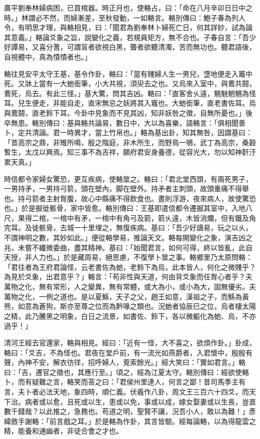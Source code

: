 \begin{pinyinscope}
廣平劉奉林婦病困，已買棺器。時正月也，使輅占，曰：「命在八月辛卯日日中之時。」林謂必不然，而婦漸差，至秋發動，一如輅言。輅別傳曰：鮑子春為列人令，有明思才理，與輅相見，曰：「聞君為劉奉林卜婦死亡日，何其詳妙，試為論其意義。」輅論爻象之旨，說變化之義，若規員矩方，無不合也。子春自言：「吾少好譚易，又喜分蓍，可謂盲者欲視白黑，聾者欲聽清濁，苦而無功也。聽君語後，自視體中，真為憒憒者也。」

輅往見安平太守王基，基令作卦，輅曰：「當有賤婦人生一男兒，墯地便走入竈中死。又牀上當有一大虵銜筆，小大共視，須臾去之也。又烏來入室中，與鷰共鬪，鷰死，烏去。有此三怪。」基大驚，問其吉凶。輅曰：「直客舍乆遠，魑魅魍魎為怪耳。兒生便走，非能自走，直宋無忌之妖將其入竈也。大虵銜筆，直老書佐耳。烏與鷰鬪，直老鈴下耳。今卦中見象而不見其凶，知非妖咎之徵，自無所憂也。」後卒無患。輅別傳曰：基與輅共論易，數日中，大以為喜樂，語輅言：「俱相聞善卜，定共清論。君一時異才，當上竹帛也。」輅為基出卦，知其無咎，因謂基曰：「昔高宗之鼎，非雉所鳴，殷之階庭，非木所生，而野鳥一鴝，武丁為高宗，桑穀暫生，太戊以興焉。知三事不為吉祥，願府君安身養德，從容光大，勿以知神姧汙累天真。」

時信都令家婦女驚恐，更互疾病，使輅筮之。輅曰：「君北堂西頭，有兩死男子，一男持矛，一男持弓箭，頭在壁內，脚在壁外。持矛者主刺頭，故頭重痛不得舉也。持弓箭者主射胷腹，故心中縣痛不得飲食也。晝則浮游，夜來病人，故使驚恐也。」於是掘徙骸骨，家中皆愈。輅別傳曰：王基即遣信都令遷掘其室中，入地八尺，果得二棺，一棺中有矛，一棺中有角弓及箭，箭乆遠，木皆消爛，但有鐵及角完耳。及徙骸骨，去城一十里埋之，無復疾病。基曰：「吾少好讀易，玩之以乆，不謂神明之數，其妙如此。」便從輅學易，推論天文。輅每開變化之象，演吉凶之兆，未嘗不纖微委曲，盡其精神。基曰：「始聞君言，如何可得，終以皆亂，此自天授，非人力也。」於是藏周易，絕思慮，不復學卜筮之事。輅鄉里乃太原問輅：「君往者為王府君論怪，云老書佐為虵，老鈴下為烏，此本皆人，何化之微賤乎？為見於爻象，出君意乎？」輅言：「苟非性與天道，何由背爻象而任胷心者乎？夫萬物之化，無有常形，人之變異，無有常體，或大為小，或小為大，固無優劣。夫萬物之化，一例之道也。是以夏鯀，天子之父，趙王如意，漢祖之子，而鯀為黃熊，如意為蒼狗，斯亦至尊之位而為黔喙之類也。況虵者協辰巳之位，烏者棲太陽之精，此乃騰黑之明象，白日之流景，如書佐、鈴下，各以微軀化為虵、烏，不亦過乎！」

清河王經去官還家，輅與相見。經曰：「近有一怪，大不喜之，欲煩作卦。」卦成，輅曰：「爻吉，不為怪也。君夜在堂戶前，有一流光如燕爵者，入君懷中，殷殷有聲，內神不安，解衣彷徉，招呼婦人，覔索餘光。」經大笑曰：「實如君言。」輅曰：「吉，遷官之徵也，其應行至。」頃之，經為江夏太守。輅別傳曰：經欲使輅卜，而有疑難之言，輅笑而荅之曰：「君侯州里達人，何言之鄙！昔司馬季主有言，夫卜者必法天地，象四時，順仁義。伏羲作八卦，周文王三百六十四爻，而天下治。病者或以愈，且死或以生，患或以免，事或以成，嫁女娶妻或以生長，豈直數千錢哉？以此推之，急務也。苟道之明，聖賢不讓，況吾小人，敢以為難！」彥緯斂手謝輅：「前言戲之耳。」於是輅為作卦，其言皆驗。經每論輅，以為得龍雲之精，能養和通幽者，非徒合會之才也。


\end{pinyinscope}
